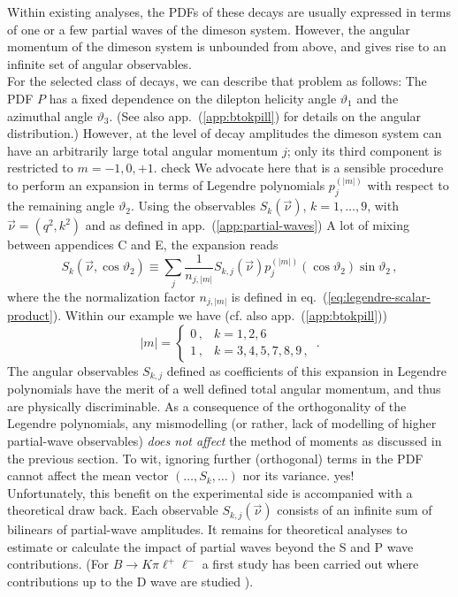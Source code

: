 \documentclass[aps,prd,reprint,nofootinbib,preprintnumbers]{revtex4}
\newcommand{\refapp}[1]{app.~(\ref{app:#1})}
\newcommand{\refeq}[1]{eq.~(\ref{eq:#1})}
\renewcommand{\theta}{\vartheta}
\newcommand{\fred}[1]{{\color{brown!85!black}#1}}
\begin{document}
Within existing analyses, the PDFs of these decays are usually expressed in terms of one or a few
partial waves of the dimeson system. However, the angular momentum of the dimeson system is unbounded
from above, and gives rise to an infinite set of angular observables.\\

For the selected class of decays, we can describe that problem as follows: The PDF $P$ has a fixed dependence on the dilepton
helicity angle $\theta_1$ and the azimuthal angle $\theta_3$. (See also \refapp{btokpill} for details
on the angular distribution.) However, at the level of decay amplitudes the dimeson system can have an arbitrarily
large total angular momentum $j$; only its third component is restricted to $m = -1,0,+1$. \fred{check}
We advocate here that is a sensible procedure to perform an expansion in terms of Legendre polynomials $p_{j}^{(|m|)}$
with respect to the remaining angle $\theta_2$. Using the observables $S_k(\vec{\nu})$, $k=1,\dots,9$, with $\vec{\nu}=(q^2, k^2)$
and as defined in \refapp{partial-waves} \fred{A lot of mixing between appendices C and E}, the expansion reads
\begin{equation}
    S_{k}(\vec{\nu},\cos\theta_2) \equiv \sum_{j} \frac{1}{n_{j,|m|}} S_{k,j}(\vec{\nu}) p_{j}^{(|m|)}(\cos\theta_2)\sin\theta_2\,,
\end{equation}
where the the normalization factor $n_{j,|m|}$ is defined in \refeq{legendre-scalar-product}. Within our
example we have (cf. also \refapp{btokpill})
\begin{equation}
    |m| = \begin{cases}
        0\,, & k = 1,2,6\,\\
        1\,, & k = 3,4,5,7,8,9\,,
    \end{cases}\,.
\end{equation}
The angular observables $S_{k,j}$ defined as coefficients of this expansion in Legendre polynomials
have the merit of a well defined total angular momentum, and thus are physically discriminable.
As a consequence of the orthogonality of the Legendre polynomials, any mismodelling (or rather, lack of modelling of higher
partial-wave observables) \emph{does not affect} the method of moments as discussed in the previous section. To wit,
ignoring further (orthogonal) terms in the PDF cannot affect the mean vector $(\dots, S_k, \dots)$ nor its variance. \fred{yes!}\\

Unfortunately, this benefit on the experimental side is accompanied with a theoretical draw back. Each observable
$S_{k,j}(\vec{\nu})$ consists of an infinite sum of bilinears of partial-wave amplitudes. It remains for theoretical
analyses to estimate or calculate the impact of partial waves beyond the S and P wave contributions.
(For $B\to K\pi\ell^+\ell^-$ a first study has been carried out where contributions up to the D wave are studied \cite{Das:2014sra}).\\
\end{document}
